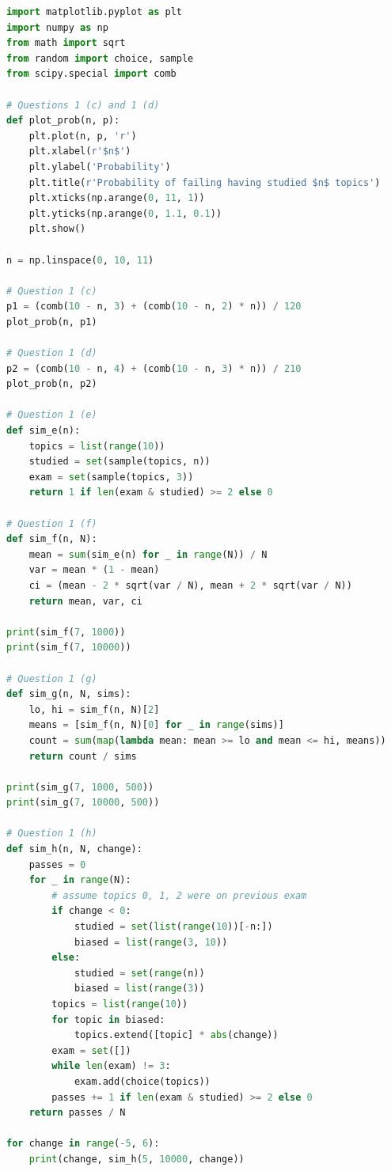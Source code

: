 \documentclass[10pt]{article}
\begin{document}
\begin{lstlisting}[language=Python]
import matplotlib.pyplot as plt
import numpy as np
from math import sqrt
from random import choice, sample
from scipy.special import comb

# Questions 1 (c) and 1 (d)
def plot_prob(n, p):    
    plt.plot(n, p, 'r')
    plt.xlabel(r'$n$')
    plt.ylabel('Probability')
    plt.title(r'Probability of failing having studied $n$ topics')
    plt.xticks(np.arange(0, 11, 1))
    plt.yticks(np.arange(0, 1.1, 0.1))
    plt.show()

n = np.linspace(0, 10, 11)

# Question 1 (c)
p1 = (comb(10 - n, 3) + (comb(10 - n, 2) * n)) / 120
plot_prob(n, p1)

# Question 1 (d)
p2 = (comb(10 - n, 4) + (comb(10 - n, 3) * n)) / 210
plot_prob(n, p2)

# Question 1 (e)
def sim_e(n):
    topics = list(range(10))
    studied = set(sample(topics, n))
    exam = set(sample(topics, 3))
    return 1 if len(exam & studied) >= 2 else 0

# Question 1 (f)
def sim_f(n, N):
    mean = sum(sim_e(n) for _ in range(N)) / N
    var = mean * (1 - mean)
    ci = (mean - 2 * sqrt(var / N), mean + 2 * sqrt(var / N))
    return mean, var, ci

print(sim_f(7, 1000))
print(sim_f(7, 10000))

# Question 1 (g)
def sim_g(n, N, sims):
    lo, hi = sim_f(n, N)[2]
    means = [sim_f(n, N)[0] for _ in range(sims)]
    count = sum(map(lambda mean: mean >= lo and mean <= hi, means))
    return count / sims

print(sim_g(7, 1000, 500))
print(sim_g(7, 10000, 500))

# Question 1 (h)
def sim_h(n, N, change):
    passes = 0
    for _ in range(N):
        # assume topics 0, 1, 2 were on previous exam
        if change < 0:
            studied = set(list(range(10))[-n:])
            biased = list(range(3, 10))
        else:
            studied = set(range(n))
            biased = list(range(3))
        topics = list(range(10))
        for topic in biased:
            topics.extend([topic] * abs(change))
        exam = set([])
        while len(exam) != 3:
            exam.add(choice(topics))
        passes += 1 if len(exam & studied) >= 2 else 0
    return passes / N

for change in range(-5, 6):
    print(change, sim_h(5, 10000, change))
\end{lstlisting}
\end{document}
